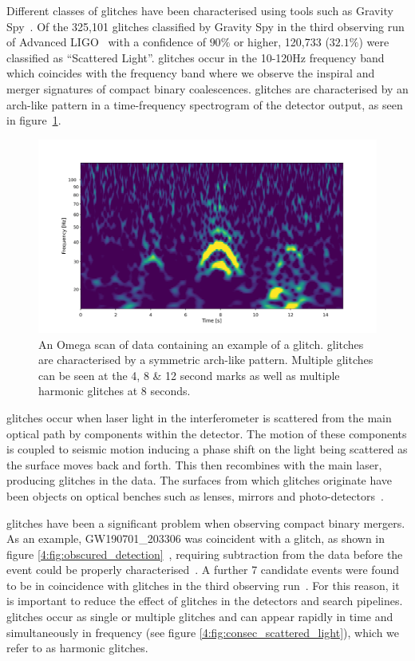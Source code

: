 Different classes of glitches have been characterised using tools such as Gravity Spy~\cite{gravityspy:2017, gravityspy:2023}. Of the 325,101 glitches classified by Gravity Spy in the third observing run of Advanced LIGO~\cite{gravityspy:2021} with a confidence of $90\%$ or higher, 120,733 ($32.1\%$) were classified as ``Scattered Light''. \Scl{} glitches occur in the 10-120Hz frequency band~\cite{reducing_scattering:2020} which coincides with the frequency band where we observe the inspiral and merger signatures of compact binary coalescences. \Scl{} glitches are characterised by an arch-like pattern in a time-frequency spectrogram of the detector output, as seen in figure~\ref{4:fig:scattered_light}. 
%
\begin{figure}
  \includegraphics[width=\textwidth]{images/4_archenemy/Section1/single_stack.pdf}
  \caption{An Omega scan \cite{gwdetchar_tools:2021} of \gw{} data containing an example of a \scl{} glitch. \Scl{} glitches are characterised by a symmetric arch-like pattern. Multiple \scl{} glitches can be seen at the 4, 8 \& 12 second marks as well as multiple harmonic glitches at 8 seconds.}
  \label{4:fig:scattered_light}
\end{figure}
%
\Scl{} glitches occur when laser light in the interferometer is scattered from the main optical path by components within the detector. The motion of these components is coupled to seismic motion inducing a phase shift on the light being scattered as the surface moves back and forth. This \scl{} then recombines with the main laser, producing \scl{} glitches in the data. The surfaces from which \scl{} glitches originate have been objects on optical benches such as lenses, mirrors and photo-detectors~\cite{TAccadia:2010}.

\Scl{} glitches have been a significant problem when observing compact binary mergers. As an example, GW190701\_203306 was coincident with a \scl{} glitch, as shown in figure \ref{4:fig:obscured_detection}~\cite{gwtc2:2021}, requiring subtraction from the data before the event could be properly characterised~\cite{O3_subtraction:2022}. A further 7 candidate events were found to be in coincidence with \scl{} glitches in the third observing run~\cite{gwtc3:2023}. For this reason, it is important to reduce the effect of \scl{} glitches in the detectors and \gw{} search pipelines. \Scl{} glitches occur as single or multiple glitches and can appear rapidly in time and simultaneously in frequency (see figure \ref{4:fig:consec_scattered_light}), which we refer to as harmonic glitches.

